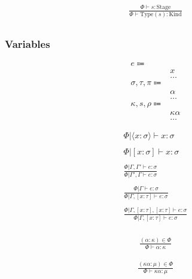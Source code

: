 \documentclass {article}
\begin{document}
\begin{gather*}
\frac
{\Phi \vdash s : \text{Stage}}
{\Phi \vdash \text {Type} (s) : \text{Kind}} \\
\end{gather*}


\subsubsection{Variables}
\begin{align*}
e \Coloneqq & \\
& x \tag{Variable} \\
& \dots \\
\sigma, \tau, \pi \Coloneqq & \\
& \alpha \tag{Type Variable} \\
& \dots \\
\kappa, s, \rho \Coloneqq & \\
& \kappa \alpha \tag{Kind Variable} \\
& \dots
\end{align*}

\begin{gather*}
\Phi | \langle x : \sigma \rangle \vdash x : \sigma \\
\\
\Phi | [ x : \sigma ] \vdash x : \sigma \\
\\
\frac
{\Phi | \Gamma, \Gamma' \vdash e : \sigma}
{\Phi | \Gamma', \Gamma \vdash e : \sigma} \\
\\
\frac
{\Phi | \Gamma \vdash e : \sigma}
{\Phi | \Gamma, [ x : \tau ] \vdash e : \sigma } \\
\\
\frac
{\Phi | \Gamma, [x : \tau], [x : \tau] \vdash e : \sigma}
{\Phi | \Gamma, [x : \tau] \vdash e : \sigma } \\
\end{gather*}

\begin{gather*}
\frac
{(\alpha : \kappa) \in \Phi}
{\Phi \vdash \alpha : \kappa}
\end{gather*}

\begin{gather*}
\frac
{(\kappa \alpha : \mu) \in \Phi}
{\Phi \vdash \kappa \alpha : \mu } \\
\end{gather*}
\end{document}
